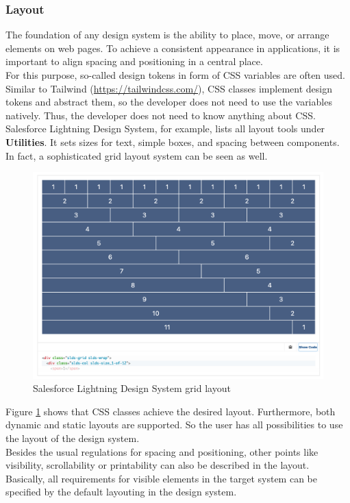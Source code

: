 \subsubsection{Layout} \label{layout}
The foundation of any design system is the ability to place, move, or arrange elements on web pages. To achieve a consistent appearance in applications, it is important to align spacing and positioning in a central place. \\ 
For this purpose, so-called design tokens in form of CSS variables are often used. Similar to Tailwind (\url{https://tailwindcss.com/}), CSS classes implement design tokens and abstract them, so the developer does not need to use the variables natively. Thus, the developer does not need to know anything about CSS.  \\
Salesforce Lightning Design System, for example, lists all layout tools under \textbf{Utilities}. It sets sizes for text, simple boxes, and spacing between components. In fact, a sophisticated grid layout system can be seen as well. \\
\begin{figure}[hbtp]
	\centerline{\includegraphics[width=\linewidth]{images/salesforce_lightning_layout.png}}
	\caption{Salesforce Lightning Design System grid layout \cite{lightning_design_system_lightning_nodate}}
	\label{salesforce_lightning_layout}
\end{figure} 

Figure \ref{salesforce_lightning_layout} shows that CSS classes achieve the desired layout. Furthermore, both dynamic and static layouts are supported. So the user has all possibilities to use the layout of the design system.\\
Besides the usual regulations for spacing and positioning, other points like visibility, scrollability or printability can also be described in the layout. Basically, all requirements for visible elements in the target system can be specified by the default layouting in the design system.

